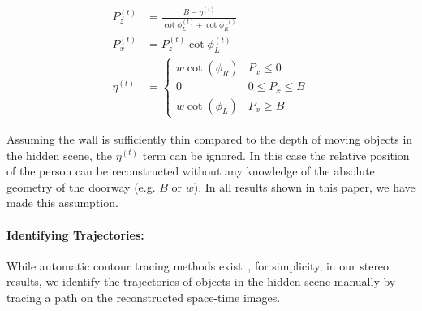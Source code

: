 




\begin{align}
    P_{z}^{(t)} &= \frac{B - \eta^{(t)} }{\cot{\phi_L^{(t)} } + \cot{\phi_R^{(t)}}} \\
    P_{x}^{(t)} &= P_{z}^{(t)} \cot{\phi_L^{(t)}} 
    \label{eq:stereo_xy} \\
       \eta^{(t)} &=
    \begin{cases} 
      w \cot( \phi_R ) & P_x \leq 0 \\
      0 & 0\leq P_x\leq B \\
       w \cot (\phi_L) & P_x \geq B 
   \end{cases}
\end{align}







Assuming the wall is sufficiently thin compared to the depth of moving objects in the hidden scene, the $\eta^{(t)}$ term can be ignored. In this case the relative position of the person can be reconstructed without any knowledge of the absolute geometry of the doorway (e.g. $B$ or $w$). In all results shown in this paper, we have made this assumption.

\vspace{-.1in}
\paragraph{Identifying Trajectories: } 
While automatic contour tracing methods exist~\cite{kass1988snakes},
for simplicity, in our stereo results, we identify the trajectories of objects in the hidden scene manually by tracing a path on the reconstructed space-time images.


